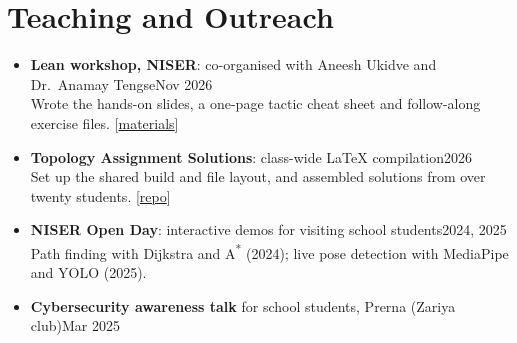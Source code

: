 \documentclass[11pt,a4paper]{article}
\newcommand{\cvdated}[2]{#1\hfill{\color{muted}#2}}
\newcommand{\links}[1]{{\small[#1]}}
\begin{document}
\section{Teaching and Outreach}
\begin{itemize}[leftmargin=1.1em]
  \item \cvdated{\textbf{Lean workshop, NISER}: co-organised with Aneesh Ukidve and Dr.\ Anamay Tengse}{Nov 2026}\\
        Wrote the hands-on slides, a one-page tactic cheat sheet and follow-along exercise files.
        \links{\href{https://github.com/Methaphur/NISER-Lean-Workshop}{materials}}
  \item \cvdated{\textbf{Topology Assignment Solutions}: class-wide \LaTeX{} compilation}{2026}\\
        Set up the shared build and file layout, and assembled solutions from over twenty students.
        \links{\href{https://github.com/Methaphur/Topology-Assignment-Solutions-2026}{repo}}
  \item \cvdated{\textbf{NISER Open Day}: interactive demos for visiting school students}{2024, 2025}\\
        Path finding with Dijkstra and A\textsuperscript{*} (2024); live pose detection with MediaPipe and YOLO (2025).
  \item \cvdated{\textbf{Cybersecurity awareness talk} for school students, Prerna (Zariya club)}{Mar 2025}
\end{itemize}

\end{document}
